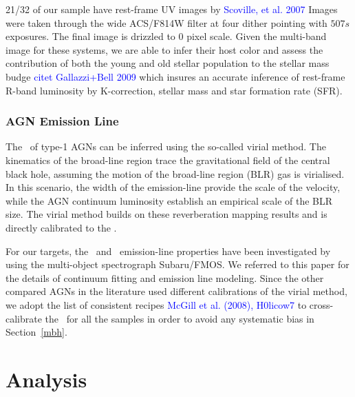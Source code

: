 \documentclass[apj]{emulateapj}
\begin{document}

21/32 of our sample have rest-frame UV images by \textcolor{blue}{Scoville, et al. 2007} %
Images were taken through the wide ACS/F814W filter at four dither pointing with $507s$ exposures. The final image is drizzled to 0 pixel scale. Given the multi-band image for these systems, we are able to infer their host color and assess the contribution of both the young and old stellar population to the stellar mass budge \textcolor{blue}{citet Gallazzi+Bell 2009} which insures an accurate inference of rest-frame R-band luminosity by K-correction, stellar mass and star formation rate (SFR). 

\subsubsection{AGN Emission Line}
\label{sec:bh_mass}
The \mbh\ of type-1 AGNs can be inferred using the so-called virial method. The kinematics of the broad-line region trace the gravitational field of the central black hole, assuming the motion of the broad-line region (BLR) gas is virialised. In this scenario, the width of the emission-line provide the scale of the velocity, while the AGN continuum luminosity establish an empirical scale of the BLR size. The virial method builds on these reverberation mapping results and is directly calibrated to the \mbh.

For our targets, the \halpha\ and \hbeta\ emission-line properties have been investigated by \citet{Schulze2018} using the multi-object spectrograph Subaru/FMOS. We referred to this paper for the details of continuum fitting and emission line modeling. Since the other compared AGNs in the literature used different calibrations of the virial method, we adopt the list of consistent recipes \textcolor{blue}{McGill et al. (2008), H0licow7} to cross-calibrate the \mbh\ for all the samples in order to avoid any systematic bias in Section~\ref{mbh}.
 
\section{Analysis}
\label{sec:analysis}
\end{document}
